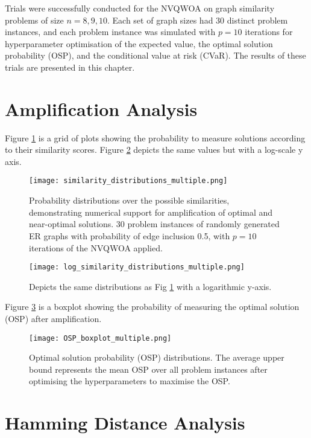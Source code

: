 Trials were successfully conducted for the NVQWOA on graph similarity problems of size $n=8,9,10$. Each set of graph sizes had 30 distinct problem instances, and each problem instance was simulated with $p=10$ iterations for hyperparameter optimisation of the expected value, the optimal solution probability (OSP), and the conditional value at risk (CVaR). The results of these trials are presented in this chapter.

\section{Amplification Analysis}
Figure \ref{fig:similarity dist} is a grid of plots showing the probability to measure solutions according to their similarity scores. Figure \ref{fig:similarity log dist} depicts the same values but with a log-scale y axis.
\begin{figure}[htbp]
    \centering
    \texttt{[image: similarity\_distributions\_multiple.png]} 
    \caption{Probability distributions over the possible similarities, demonstrating numerical support for amplification of optimal and near-optimal solutions. 30 problem instances of randomly generated ER graphs with probability of edge inclusion 0.5, with $p=10$ iterations of the NVQWOA applied.}
    \label{fig:similarity dist}
\end{figure}

\begin{figure}[htbp]
    \centering
    \texttt{[image: log\_similarity\_distributions\_multiple.png]} 
    \caption{Depicts the same distributions as Fig \ref{fig:similarity dist} with a logarithmic y-axis.}
    \label{fig:similarity log dist}
\end{figure}

Figure \ref{fig:osp} is a boxplot showing the probability of measuring the optimal solution (OSP) after amplification.
\begin{figure}[htbp]
    \centering
    \texttt{[image: OSP\_boxplot\_multiple.png]} 
    \caption{Optimal solution probability (OSP) distributions. The average upper bound represents the mean OSP over all problem instances after optimising the hyperparameters to maximise the OSP.}
    \label{fig:osp}
\end{figure}



\section{Hamming Distance Analysis}


